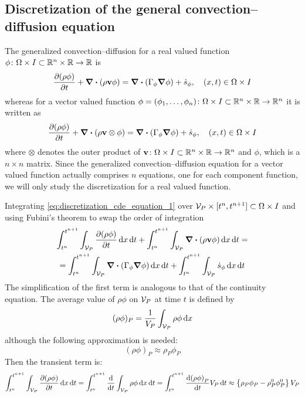 
\subsection{Discretization of the general convection--diffusion equation}
\label{sec:discretization_general_cde}

The generalized convection--diffusion for a real valued function $\phi \colon
\Omega \times I \subset \mathbb{R}^n \times \mathbb{R} \rightarrow \mathbb{R}$ is
\begin{equation} \label{eq:discretization_cde_equation_1}
	\pdv{(\rho \phi)}{t} + \div(\rho \vb{v} \phi) = 
	\div(\Gamma_\phi \grad{\phi}) + \dot{s}_\phi,
	\quad (x, t) \in \Omega \times I
\end{equation}
whereas for a vector valued function $\phi = (\phi_1, \ldots, \phi_n) \colon
\Omega \times I \subset \mathbb{R}^n \times \mathbb{R} \rightarrow \mathbb{R}^n$ it is written
as
\begin{equation*}
	\pdv{(\rho \phi)}{t} + \div(\rho \vb{v} \otimes \phi) = 
	\div(\Gamma_\phi \grad{\phi}) + \dot{s}_\phi,
	\quad (x, t) \in \Omega \times I
\end{equation*}
where $\otimes$ denotes the outer product of $\vb{v} \colon \Omega \times I
\subset \mathbb{R}^n \times \mathbb{R} \rightarrow \mathbb{R}^n$ and $\phi$, which is a $n
\times n$ matrix. Since the generalized convection--diffusion equation for a
vector valued function actually comprises $n$ equations, one for each component
function, we will only study the discretization for a real valued function.

Integrating \eqref{eq:discretization_cde_equation_1} over $\mathcal{V}_{P} \times [t^n,
t^{n+1}] \subset \Omega \times I$ and using Fubini's theorem to swap the order
of integration
\begin{multline*}
	\int_{t^n}^{t^{n+1}} \int_{\mathcal{V}_{P}} \pdv{(\rho \phi)}{t} \dd{x} \dd{t} + 
	\int_{t^n}^{t^{n+1}} \int_{\mathcal{V}_{P}} \div(\rho \vb{v} \phi) \dd{x} \dd{t} = \\ = 
	\int_{t^n}^{t^{n+1}} \int_{\mathcal{V}_{P}} \div(\Gamma_\phi \grad{\phi}) \dd{x} \dd{t} +
	\int_{t^n}^{t^{n+1}} \int_{\mathcal{V}_{P}} \dot{s}_\phi \dd{x} \dd{t}	
\end{multline*}
The simplification of the first term is analogous to that of the continuity
equation. The average value of $\rho \phi$ on $\mathcal{V}_{P}$ at time $t$ is defined by
\begin{equation*}
	(\rho \phi)_P = \frac{1}{V_P} \int_{\mathcal{V}_{P}} \rho \phi \dd{x}
\end{equation*}
although the following approximation is needed:
\begin{equation*}
	(\rho \phi)_P \approx \rho_P \phi_P
\end{equation*}
Then the transient term is:
\begin{equation*}
	\int_{t^n}^{t^{n+1}} \int_{\mathcal{V}_{P}} \pdv{(\rho \phi)}{t} \dd{x} \dd{t} = 
	\int_{t^n}^{t^{n+1}} \frac{\dd}{\dd{t}} \int_{\mathcal{V}_{P}} \rho \phi \dd{x} \dd{t} =  
	\int_{t^n}^{t^{n+1}} \frac{\dd(\rho \phi)_P}{\dd{t}} V_P \dd{t} \approx 
	\left\{ \rho_P \phi_P - \rho_P^0 \phi_P^0 \right\} V_P
\end{equation*}

